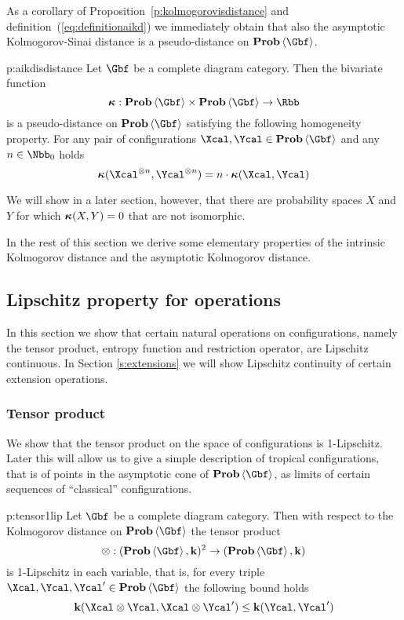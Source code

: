 As a corollary of Proposition~\ref{p:kolmogorovisdistance} and 
definition~(\ref{eq:definitionaikd}) we immediately obtain 
that also the asymptotic Kolmogorov-Sinai distance is a pseudo-distance on $\prob\<\Gbf>$.
\begin{corollary}{p:aikdisdistance}
  Let $\Gbf$ be a complete diagram category.
  Then the bivariate function 
  \[
    \aikd:\prob\<\Gbf> \times \prob\<\Gbf>\to\Rbb
  \]
  is a pseudo-distance on $\Prob\<\Gbf>$ satisfying the following
  homogeneity property.
  For any pair of configurations $\Xcal,\Ycal\in\Prob\<\Gbf>$ and any
  $n\in\Nbb_{0}$ holds
  \[
  \aikd(\Xcal^{\otimes n},\Ycal^{\otimes n})=n\cdot\aikd(\Xcal,\Ycal)
  \]
\end{corollary}

We will show in a later section, however, that there
are probability spaces $X$ and $Y$ for which $\operatorname{{\bm\kappa}}(X, Y) = 0$ that
are not isomorphic.


\bigskip 

In the rest of this section we derive some elementary properties of the intrinsic 
Kolmogorov distance and the asymptotic Kolmogorov distance.

\subsection[Lipschitz property]
{Lipschitz property for operations}
\label{s:kolmogorov-lipschitz}
  In this section we show that certain natural operations on
  configurations, namely the tensor product, entropy function and
  restriction operator, are Lipschitz continuous.  In Section
  \ref{s:extensions} we will show Lipschitz continuity of certain
  extension operations.

\subsubsection{Tensor product}\label{s:kolmogorov-lipschitz-tensor}
  We show that the tensor product on the space of configurations is
  1-Lipschitz. Later this will allow us to give a simple description
  of tropical configurations, that is of points in the asymptotic cone of
  $\prob\<\Gbf>$, as limits of certain sequences of ``classical''
  configurations.

\begin{proposition}{p:tensor1lip}
  Let $\Gbf$ be a complete diagram category.
  Then with respect to the Kolmogorov distance on $\prob\<\Gbf>$
  the tensor product
  \[
  \otimes:(\Prob\<\Gbf>,\ikd)^2\to(\Prob\<\Gbf>,\ikd)
  \]
  is 1-Lipschitz in each variable, that is, for every triple $\Xcal,
  \Ycal, \Ycal' \in \Prob\<\Gbf>$ the following
    bound holds
  \[
  \ikd(\Xcal \otimes \Ycal, \Xcal \otimes \Ycal') 
  \leq 
  \ikd(\Ycal,\Ycal')
  \]
\end{proposition}

